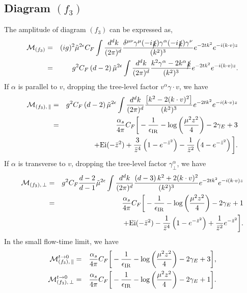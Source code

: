 \subsection{Diagram $(f_3)$}
The amplitude of diagram $(f_3)$ can be expressed as,
\begin{eqnarray}
\mathcal{M}_{(f_3)} &=&(ig)^2\tilde{\mu}^{2\epsilon} C_F \int \frac{d^d k}{(2\pi)^d} \frac{\delta^{\mu\nu}\gamma^\mu(-i\slashed{k})\gamma^\alpha(-i\slashed{k})\gamma^\nu}{(k^2)^3}e^{-2t k^2}e^{-i(k\cdot v)z}\nonumber\\
&=& g^2C_F \left(d-2\right)\tilde{\mu}^{2\epsilon} \int \frac{d^d k}{(2\pi)^d} \frac{k^2\gamma^\alpha -2k^\alpha\slashed{k}}{(k^2)^3}e^{-2t k^2}e^{-i(k\cdot v)z}.
\end{eqnarray}
If $\alpha$ is parallel to $v$, dropping the tree-level factor $v^{\alpha}\gamma\cdot v $, we have
\begin{eqnarray}
\label{eq:resultsdiagrama0}
\mathcal{M}_{(f_3),\, \|}
&=& g^2C_F \left(d-2\right)\tilde{\mu}^{2\epsilon}  \int \frac{d^d k}{(2\pi)^d} \frac{\left[k^2-2(k\cdot v)^2\right]}{(k^2)^3}e^{-2t k^2}e^{-i(k\cdot v)z}\nonumber\\
&=&\frac{\alpha_s}{4\pi}C_F\bigg[-\frac{1}{\epsilon_{\rm IR}} - \log\left(\frac{\mu^2z^2}{4}\right) -2\gamma_E +3 \nonumber\\
&&\, \, \, \, \, \, \, \,\, \, \, \, \, \, \, \, \,  \, \, \,  +\text{Ei}(-\bar{z}^2) +\frac{3}{\bar{z}^4}\left(1-e^{-\bar{z}^2}\right) - \frac{1}{\bar{z}^2}\left(4-e^{-\bar{z}^2}\right)\bigg].
\end{eqnarray}
If $\alpha$ is transverse to $v$,  dropping the tree-level factor $\gamma^{\alpha}_{\perp}$, we have
\begin{eqnarray}
\label{eq:resultsdiagramaalpha}
\mathcal{M}_{(f_3),\, \perp}&=& g^2C_F \frac{d-2}{d-1}\tilde{\mu}^{2\epsilon}  \int \frac{d^d k}{(2\pi)^d} \frac{\left(d-3\right)k^2+2(k\cdot v)^2}{(k^2)^3}e^{-2t k^2}e^{-i(k\cdot v)z}\nonumber\\
&=&\frac{\alpha_s}{4\pi}C_F\bigg[-\frac{1}{\epsilon_{\rm IR}} - \log\left(\frac{\mu^2z^2}{4}\right) -2\gamma_E +1 \nonumber\\
&&\, \, \, \, \, \, \, \,\, \, \, \, \, \, \, \, \,  \, \, \,  +\text{Ei}(-\bar{z}^2) - \frac{1}{\bar{z}^4}\left(1-e^{-\bar{z}^2}\right) + \frac{1}{\bar{z}^2}
e^{-\bar{z}^2}\bigg].
\end{eqnarray}
In the small flow-time limit, we have
\begin{eqnarray}
\mathcal{M}_{(f_3),\, \|}^{t\rightarrow 0} &= &\frac{\alpha_s}{4\pi}C_F\bigg[-\frac{1}{\epsilon_{\rm IR}} - \log\left(\frac{\mu^2z^2}{4}\right) -2\gamma_E +3 \bigg],\\
\mathcal{M}_{(f_3),\, \perp}^{t\rightarrow 0} &= &\frac{\alpha_s}{4\pi}C_F\bigg[-\frac{1}{\epsilon_{\rm IR}} - \log\left(\frac{\mu^2z^2}{4}\right) -2\gamma_E +1 \bigg].
\end{eqnarray}
